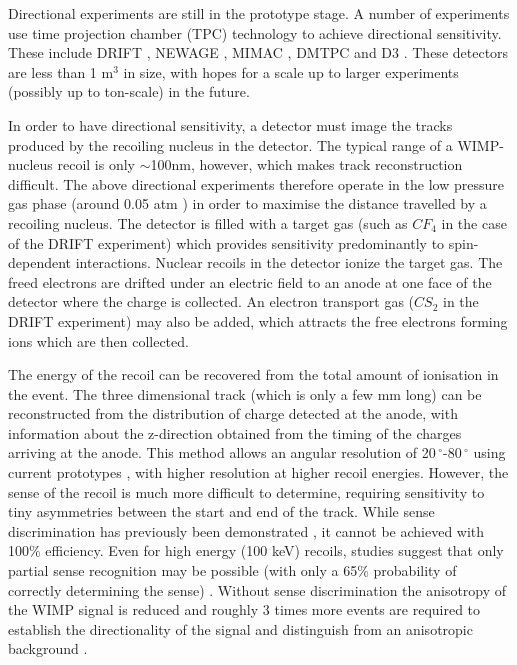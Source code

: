 Directional experiments are still in the prototype stage. A number of experiments use time projection chamber (TPC) technology to achieve directional sensitivity. These include DRIFT \cite{Daw:2011,Daw:2012}, NEWAGE \cite{Miuchi:2010,Miuchi:2012}, MIMAC \cite{Riffard:2013, Santos:2013}, DMTPC \cite{Monroe:2012,Battat:2013} and D3 \cite{Vahsen:2012}. These detectors are less than 1 $\textrm{m}^3$ in size, with hopes for a scale up to larger experiments (possibly up to ton-scale) in the future.

In order to have directional sensitivity, a detector must image the tracks produced by the recoiling nucleus in the detector. The typical range of a WIMP-nucleus recoil is only $\sim$100nm, however, which makes track reconstruction difficult. The above directional experiments therefore operate in the low pressure gas phase (around 0.05 atm \cite{Daw:2012}) in order to maximise the distance travelled by a recoiling nucleus. The detector is filled with a target gas (such as $CF_4$ in the case of the DRIFT experiment) which provides sensitivity predominantly to spin-dependent interactions. Nuclear recoils in the detector ionize the target gas. The freed electrons are drifted under an electric field to an anode at one face of the detector where the charge is collected. An electron transport gas ($CS_2$ in the DRIFT experiment) may also be added, which attracts the free electrons forming ions which are then collected. 

The energy of the recoil can be recovered from the total amount of ionisation in the event. The three dimensional track (which is only a few mm long) can be reconstructed from the distribution of charge detected at the anode, with information about the z-direction obtained from the timing of the charges arriving at the anode. This method allows an angular resolution of 20$\,^{\circ}$-80$\,^{\circ}$ using current prototypes \cite{Billard:2012}, with higher resolution at higher recoil energies. However, the sense of the recoil is much more difficult to determine, requiring sensitivity to tiny asymmetries between the start and end of the track. While sense discrimination has previously been demonstrated \cite{Burgos:2008}, it cannot be achieved with 100\% efficiency. Even for high energy (100 keV) recoils, studies suggest that only partial sense recognition may be possible (with only a 65\% probability of correctly determining the sense) \cite{Billard:2012}. Without sense discrimination the anisotropy of the WIMP signal is reduced and roughly 3 times more events are required to establish the directionality of the signal and distinguish from an anisotropic background \cite{Morgan:2005,Green:2008}.


